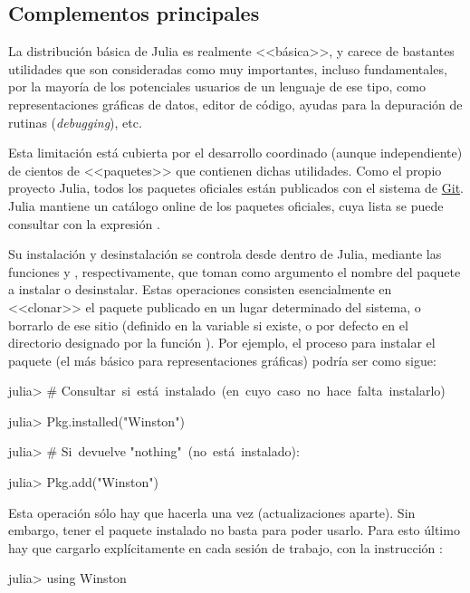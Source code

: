 ﻿\documentclass[spanish]{article}
\begin{document}
\subsection{Complementos principales}

La distribución básica de Julia es realmente <<básica>>, y carece
de bastantes utilidades que son consideradas como muy importantes,
incluso fundamentales, por la mayoría de los potenciales usuarios
de un lenguaje de ese tipo, como representaciones gráficas de datos,
editor de código, ayudas para la depuración de rutinas (\emph{debugging}),
etc.

Esta limitación está cubierta por el desarrollo coordinado (aunque
independiente) de cientos de <<paquetes>> que contienen dichas utilidades.
Como el propio proyecto Julia, todos los paquetes oficiales están
publicados con el sistema de \href{http://git-scm.com/}{Git}. Julia
mantiene un catálogo online de los paquetes oficiales, cuya lista
se puede consultar con la expresión .

Su instalación y desinstalación se controla desde dentro de Julia,
mediante las funciones  y , respectivamente,
que toman como argumento el nombre del paquete a instalar o desinstalar.
Estas operaciones consisten esencialmente en <<clonar>> el paquete
publicado en un lugar determinado del sistema, o borrarlo de ese sitio
(definido en la variable  si existe, o por defecto
en el directorio designado por la función ). Por ejemplo,
el proceso para instalar el paquete  (el más básico
para representaciones gráficas) podría ser como sigue:

julia> # Consultar~si~está~instalado~(en~cuyo~caso~no~hace~falta~instalarlo)

julia> Pkg.installed("Winston")

julia> # Si~devuelve "nothing"~(no~está~instalado):

julia> Pkg.add("Winston")

Esta operación sólo hay que hacerla una vez (actualizaciones aparte).
Sin embargo, tener el paquete instalado no basta para poder usarlo.
Para esto último hay que cargarlo explícitamente en cada sesión de
trabajo, con la instrucción :

julia> using Winston
\end{document}
